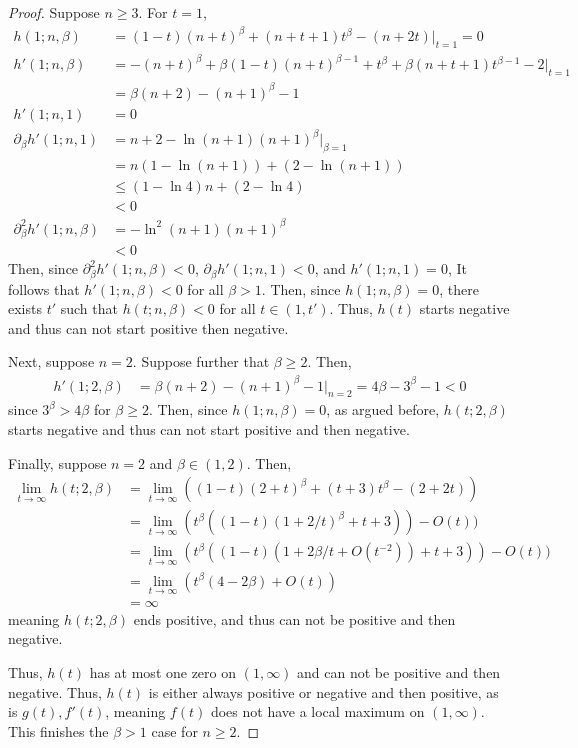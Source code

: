 \documentclass[10pt,a4paper]{amsart}
\newcommand{\p}{\partial}
\begin{document}
\begin{proof}
Suppose $n\geq 3$. For $t=1$,
\begin{align*}
    h(1;n,\beta)&=(1-t)(n+t)^\beta +(n+t+1)t^\beta-(n+2t)\bigg|_{t=1}=0\\
    h'(1;n,\beta)&=-(n+t)^\beta +\beta(1-t)(n+t)^{\beta-1}+t^\beta + \beta (n+t+1) t^{\beta-1}-2\bigg|_{t=1}\\
    &=\beta(n+2)-(n+1)^\beta-1\\
    h'(1;n,1)&=0\\
    \p_\beta h'(1;n,1)&=n+2-\ln(n+1)(n+1)^\beta \bigg|_{\beta=1}\\&=n(1-\ln(n+1))+(2-\ln(n+1))\\
    &\leq (1-\ln 4)n+(2-\ln 4)\\
    &<0\\
    \p_\beta^2 h'(1;n,\beta)&=-\ln^2(n+1)(n+1)^\beta \\&< 0 
\end{align*}
Then, since $\p_\beta^2 h'(1;n,\beta)<0$, $\p_\beta h'(1;n,1)<0$, and $h'(1;n,1)=0$, It follows that $h'(1;n,\beta)<0$ for all $\beta > 1$. Then, since $h(1;n,\beta)=0$, there exists $t'$ such that $h(t;n,\beta)<0$ for all $t\in (1,t')$. Thus, $h(t)$ starts negative and thus can not start positive then negative. 

Next, suppose $n=2$. Suppose further that $\beta \geq 2$. Then, 
\begin{align*}
    h'(1;2,\beta)&=\beta(n+2)-(n+1)^\beta -1 \bigg|_{n=2}=4\beta-3^\beta -1<0
\end{align*}
since $3^\beta > 4\beta $ for $\beta \geq 2$. Then, since $h(1;n,\beta)=0$, as argued before, $h(t;2,\beta)$ starts negative and thus can not start positive and then negative. 

Finally, suppose $n=2$ and $\beta \in (1,2)$. Then, 
\begin{align*}
    \lim_{t\to \infty}h(t;2,\beta)&=\lim_{t\to \infty}((1-t)(2+t)^\beta +(t+3)t^\beta -(2+2t))\\
    &=\lim_{t\to \infty}(t^\beta ((1-t)(1+2/t)^\beta +t+3))-O(t))\\
    &=\lim_{t\to \infty}(t^\beta ((1-t)(1+2\beta/t+O(t^{-2})) +t+3))-O(t))\\
    &=\lim_{t\to \infty}(t^\beta (4-2\beta )+O(t))\\
    &=\infty
\end{align*}
meaning $h(t;2,\beta)$ ends positive, and thus can not be positive and then negative. 

Thus, $h(t)$ has at most one zero on $(1,\infty)$ and can not be positive and then negative. Thus, $h(t)$ is either always positive or negative and then positive, as is $g(t),f'(t)$, meaning $f(t)$ does not have a local maximum on $(1,\infty)$. This finishes the $\beta > 1$ case for $n\geq 2$. 


\end{proof}
\end{document}
